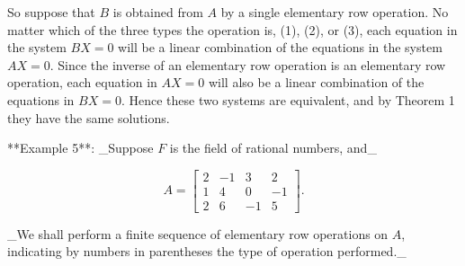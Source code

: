 So suppose that \(B\) is obtained from \(A\) by a single elementary row operation. No matter which of the three types the operation is, (1), (2), or (3), each equation in the system \(BX=0\) will be a linear combination of the equations in the system \(AX=0\). Since the inverse of an elementary row operation is an elementary row operation, each equation in \(AX=0\) will also be a linear combination of the equations in \(BX=0\). Hence these two systems are equivalent, and by Theorem 1 they have the same solutions.

**Example 5**: _Suppose \(F\) is the field of rational numbers, and_

\[A=\begin{bmatrix}2&-1&3&2\\ 1&4&0&-1\\ 2&6&-1&5\end{bmatrix}.\]

_We shall perform a finite sequence of elementary row operations on \(A\), indicating by numbers in parentheses the type of operation performed._

